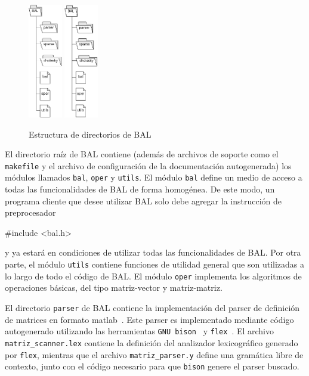 \documentclass[a4paper,10pt]{article}
\begin{document}
\begin{figure}
  \vspace{-20pt}
  \begin{center}
	\ifpdf
		\includegraphics[height=5cm]{img/estructura.png}
	\else
		\includegraphics[height=5cm]{img/estructura.eps}
	\fi
  \end{center}
  \vspace{-20pt}
  \caption{Estructura de directorios de BAL}
  \vspace{-40pt}
\end{figure}
El directorio raíz de BAL contiene (además de archivos de soporte como el \texttt{makefile} y el archivo de configuración de la documentación autogenerada) los módulos llamados \texttt{bal}, \texttt{oper} y \texttt{utils}. El módulo \texttt{bal} define un medio de acceso a todas las funcionalidades de BAL de forma homogénea. De este modo, un programa cliente que desee utilizar BAL solo debe agregar la instrucción de preprocesador
\begin{SmallVerbatim}
#include <bal.h>
\end{SmallVerbatim}
y ya estará en condiciones de utilizar todas las funcionalidades de BAL. Por otra parte, el módulo \texttt{utils} contiene funciones de utilidad general que son utilizadas a lo largo de todo el código de BAL. El módulo \texttt{oper} implementa los algoritmos de operaciones básicas, del tipo matriz-vector y matriz-matriz.

El directorio \texttt{parser} de BAL contiene  la implementación del parser de definición de matrices en formato matlab~\cite{matlab}. Este parser es implementado mediante código autogenerado utilizando las herramientas \texttt{GNU bison}~\cite{bison} y \texttt{flex}~\cite{flex}. El archivo \texttt{matriz\_scanner.lex} contiene la definición del analizador lexicográfico generado por \texttt{flex}, mientras que el archivo \texttt{matriz\_parser.y} define una gramática libre de contexto, junto con el código necesario para que \texttt{bison} genere el parser buscado.
\end{document}

